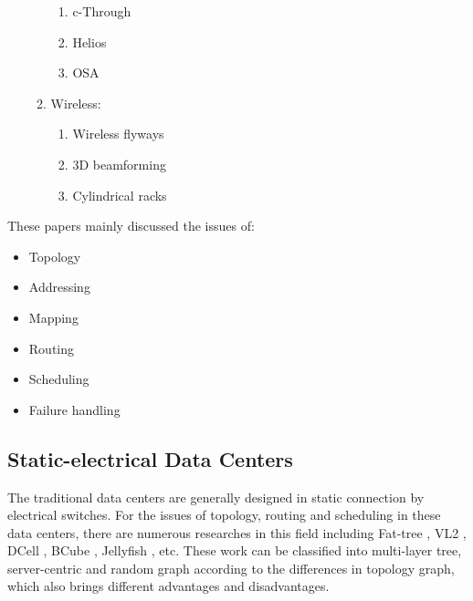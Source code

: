 \documentclass[journal,onecolumn,11pt]{IEEEtran}
\begin{document}
\begin{enumerate}
\begin{enumerate}
\begin{enumerate}
      \item c-Through \cite{Wang:2010:CPO:1851182.1851222}
      \item Helios \cite{Farrington:2010:HHE:1851182.1851223}
      \item OSA \cite{chen2012osa}
    \end{enumerate}
    \item Wireless:
    \begin{enumerate}
      \item Wireless flyways \cite{Halperin:2011:ADC:2018436.2018442}
      \item 3D beamforming \cite{Zhou:2012:MMC:2342356.2342440}
      \item Cylindrical racks \cite{Shin:2012:FCW:2396556.2396560}
    \end{enumerate}
  \end{enumerate}
\end{enumerate}

These papers mainly discussed the issues of:
\begin{itemize}
  \item Topology \cite{Al-Fares:2008:SCD:1402958.1402967,Greenberg:2009:VSF:1592568.1592576,Guo:2008:DSF:1402958.1402968,Guo:2009:BHP:1592568.1592577,singla2012jellyfish}
  \item Addressing \cite{Al-Fares:2008:SCD:1402958.1402967,Greenberg:2009:VSF:1592568.1592576}
  \item Mapping \cite{Chen:2010:GAA:1851182.1851190,Greenberg:2009:VSF:1592568.1592576}
  \item Routing \cite{Guo:2008:DSF:1402958.1402968,Guo:2009:BHP:1592568.1592577}
  \item Scheduling \cite{Al-Fares:2008:SCD:1402958.1402967,Halperin:2011:ADC:2018436.2018442}
  \item Failure handling \cite{Chen:2010:GAA:1851182.1851190,NiranjanMysore:2009:PSF:1592568.1592575,Wu:2012:NAD:2342356.2342438}
\end{itemize}

\subsection{Static-electrical Data Centers}

The traditional data centers are generally designed in static connection by electrical switches. For the issues of topology, routing and scheduling in these data centers, there are numerous researches in this field including Fat-tree \cite{Al-Fares:2008:SCD:1402958.1402967}, VL2 \cite{Greenberg:2009:VSF:1592568.1592576}, DCell \cite{Guo:2008:DSF:1402958.1402968}, BCube \cite{Guo:2009:BHP:1592568.1592577}, Jellyfish \cite{singla2012jellyfish}, etc. These work can be classified into multi-layer tree, server-centric and random graph according to the differences in topology graph, which also brings different advantages and disadvantages.
\end{document}
